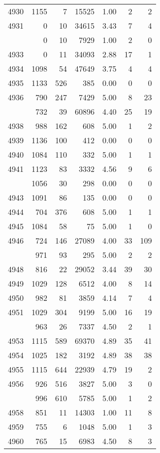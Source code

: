\documentclass[
]{article}
\begin{document}
\begin{table}
\begin{tabular}[t]{lrrrrrr}
4930 & 1155 & 7 & 15525 & 1.00 & 2 & 2\\
4931 & 0 & 10 & 34615 & 3.43 & 7 & 4\\
\addlinespace
4932 & 0 & 10 & 7929 & 1.00 & 2 & 0\\
4933 & 0 & 11 & 34093 & 2.88 & 17 & 1\\
4934 & 1098 & 54 & 47649 & 3.75 & 4 & 4\\
4935 & 1133 & 526 & 385 & 0.00 & 0 & 0\\
4936 & 790 & 247 & 7429 & 5.00 & 8 & 23\\
\addlinespace
4937 & 732 & 39 & 60896 & 4.40 & 25 & 19\\
4938 & 988 & 162 & 608 & 5.00 & 1 & 2\\
4939 & 1136 & 100 & 412 & 0.00 & 0 & 0\\
4940 & 1084 & 110 & 332 & 5.00 & 1 & 1\\
4941 & 1123 & 83 & 3332 & 4.56 & 9 & 6\\
\addlinespace
4942 & 1056 & 30 & 298 & 0.00 & 0 & 0\\
4943 & 1091 & 86 & 135 & 0.00 & 0 & 0\\
4944 & 704 & 376 & 608 & 5.00 & 1 & 1\\
4945 & 1084 & 58 & 75 & 5.00 & 1 & 0\\
4946 & 724 & 146 & 27089 & 4.00 & 33 & 109\\
\addlinespace
4947 & 971 & 93 & 295 & 5.00 & 2 & 2\\
4948 & 816 & 22 & 29052 & 3.44 & 39 & 30\\
4949 & 1029 & 128 & 6512 & 4.00 & 8 & 14\\
4950 & 982 & 81 & 3859 & 4.14 & 7 & 4\\
4951 & 1029 & 304 & 9199 & 5.00 & 16 & 19\\
\addlinespace
4952 & 963 & 26 & 7337 & 4.50 & 2 & 1\\
4953 & 1115 & 589 & 69370 & 4.89 & 35 & 41\\
4954 & 1025 & 182 & 3192 & 4.89 & 38 & 38\\
4955 & 1115 & 644 & 22939 & 4.79 & 19 & 2\\
4956 & 926 & 516 & 3827 & 5.00 & 3 & 0\\
\addlinespace
4957 & 996 & 610 & 5785 & 5.00 & 1 & 2\\
4958 & 851 & 11 & 14303 & 1.00 & 11 & 8\\
4959 & 755 & 6 & 1048 & 5.00 & 1 & 3\\
4960 & 765 & 15 & 6983 & 4.50 & 8 & 3\\

\end{tabular}
\end{table}
\end{document}
